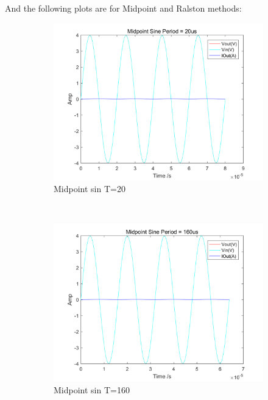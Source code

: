 \documentclass[a4paper, 12pt]{article}
\begin{document}
\newpage
And the following plots are for Midpoint and Ralston methods:
\begin{figure}[h]
      \centering
      \begin{subfigure}[b]{0.4\textwidth}
            \includegraphics[width=\textwidth]{ex1/midpoint_mid_sin_20.png}
            \caption{Midpoint sin T=20}
      \end{subfigure}
      ~
      \begin{subfigure}[b]{0.4\textwidth}
            \includegraphics[width=\textwidth]{ex1/midpoint_mid_sin_160.png}
            \caption{Midpoint sin T=160}
      \end{subfigure}
       ~
      \begin{subfigure}[b]{0.4\textwidth}

\end{subfigure}
\end{figure}
\end{document}
